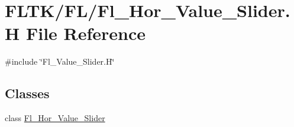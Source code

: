 \hypertarget{_fl___hor___value___slider_8_h}{}\section{F\+L\+T\+K/\+F\+L/\+Fl\+\_\+\+Hor\+\_\+\+Value\+\_\+\+Slider.H File Reference}
\label{_fl___hor___value___slider_8_h}
{\ttfamily \#include \char`\"{}Fl\+\_\+\+Value\+\_\+\+Slider.\+H\char`\"{}}\newline
\subsection*{Classes}
\begin{DoxyCompactItemize}
\item 
class \hyperlink{class_fl___hor___value___slider}{Fl\+\_\+\+Hor\+\_\+\+Value\+\_\+\+Slider}
\end{DoxyCompactItemize}
